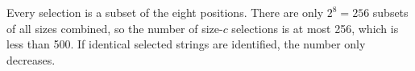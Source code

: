 Every selection is a subset of the eight positions. There are only $2^8=256$ subsets of all sizes combined, so the number of size-$c$ selections is at most 256, which is less than 500. If identical selected strings are identified, the number only decreases.
